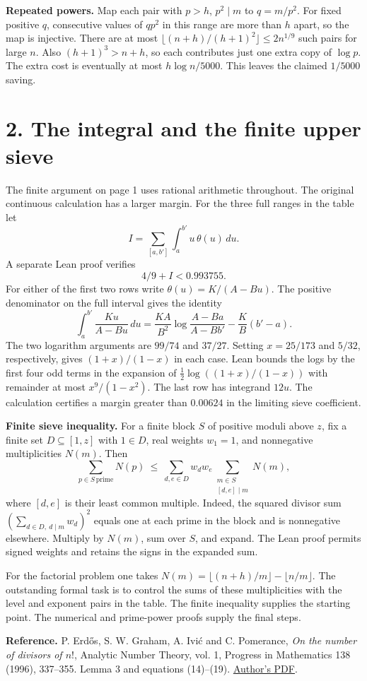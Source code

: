 \documentclass[10pt]{article}
\newcommand{\thetar}{\theta}
\begin{document}
\textbf{Repeated powers.} Map each pair with $p>h$, $p^2\mid m$ to $q=m/p^2$. For fixed positive $q$, consecutive values of $qp^2$ in this range are more than $h$ apart, so the map is injective. There are at most $\lfloor(n+h)/(h+1)^2\rfloor\le 2n^{1/9}$ such pairs for large $n$. Also $(h+1)^3>n+h$, so each contributes just one extra copy of $\log p$. The extra cost is eventually at most $h\log n/5000$. This leaves the claimed $1/5000$ saving.

\newpage
\section*{2. The integral and the finite upper sieve}
The finite argument on page 1 uses rational arithmetic throughout. The original continuous calculation has a larger margin. For the three full ranges in the table let
\[
 I=\sum_{[a,b']}\int_a^{b'}u\,\thetar(u)\,du .
\]
A separate Lean proof verifies
\[
                       4/9+I<0.993755.
\]
For either of the first two rows write $\thetar(u)=K/(A-Bu)$. The positive denominator on the full interval gives the identity
\[
 \int_a^{b'}\frac{Ku}{A-Bu}\,du=
 \frac{KA}{B^2}\log\!\frac{A-Ba}{A-Bb'}-\frac{K}{B}(b'-a).
\]
The two logarithm arguments are $99/74$ and $37/27$. Setting $x=25/173$ and $5/32$, respectively, gives $(1+x)/(1-x)$ in each case. Lean bounds the logs by the first four odd terms in the expansion of $\tfrac12\log((1+x)/(1-x))$ with remainder at most $x^9/(1-x^2)$. The last row has integrand $12u$. The calculation certifies a margin greater than $0.00624$ in the limiting sieve coefficient.

\textbf{Finite sieve inequality.} For a finite block $S$ of positive moduli above $z$, fix a finite set $D\subseteq[1,z]$ with $1\in D$, real weights $w_1=1$, and nonnegative multiplicities $N(m)$. Then
\[
  \sum_{p\in S\,\mathrm{prime}}N(p)
  \ \le\ \sum_{d,e\in D}w_dw_e
         \sum_{\substack{m\in S\\{[d,e]}\mid m}}N(m),
\]
where $[d,e]$ is their least common multiple. Indeed, the squared divisor sum
$(\sum_{d\in D,\ d\mid m}w_d)^2$ equals one at each prime in the block and is nonnegative elsewhere. Multiply by $N(m)$, sum over $S$, and expand. The Lean proof permits signed weights and retains the signs in the expanded sum.

For the factorial problem one takes $N(m)=\lfloor(n+h)/m\rfloor-\lfloor n/m\rfloor$. The outstanding formal task is to control the sums of these multiplicities with the level and exponent pairs in the table. The finite inequality supplies the starting point. The numerical and prime-power proofs supply the final steps.

\medskip
{\small\textbf{Reference.} P. Erd\H{o}s, S. W. Graham, A. Ivi\'c and C. Pomerance, \emph{On the number of divisors of $n!$}, Analytic Number Theory, vol. 1, Progress in Mathematics 138 (1996), 337--355. Lemma 3 and equations (14)--(19). \href{https://math.dartmouth.edu/~carlp/factorial.pdf}{Author's PDF}.}
\end{document}
